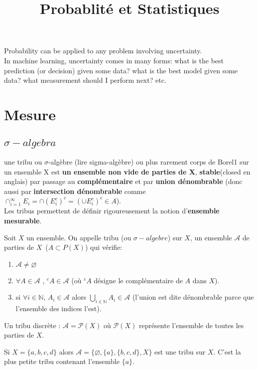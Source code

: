 \documentclass{article}
\begin{document}
\title{Probablit\'e et Statistiques}
\maketitle
\tableofcontents
\newpage
Probability can be applied to any problem involving uncertainty.\\
In machine learning, uncertainty comes in many forms: what is the best prediction (or decision) given some data?
what is the best model given some data? what measurement should I perform next? etc.
\section{Mesure}
\subsection{$\sigma-algebra$}
une tribu ou $\sigma$-alg\`ebre (lire sigma-alg\`ebre) ou plus rarement corps de Borel1
sur un ensemble X est \textbf{un ensemble non vide de parties de X},
\textbf{stable}(closed en anglais) par passage au \textbf{compl\'ementaire} et par \textbf{union d\'enombrable}
(donc aussi par \textbf{intersection d\'enombrable} comme $\cap_{i=1}^{\infty} E_i = \cap(E_i^c)^c = (\cup E_i^c)^c \in A$).\\
Les tribus permettent de d\'efinir rigoureusement la notion d'\textbf{ensemble mesurable}.

\begin{definition}
Soit $X$ un ensemble. On appelle tribu (ou $\sigma-algebre$) sur $X$, un ensemble $\mathcal{A}$ de parties de $X$\ ($A \subset P(X)$) qui v\'erifie:
\begin{enumerate}
\item $\mathcal{A} \not=\varnothing$
\item $\forall A \in \mathcal{A}$ ,  ${}^c A \in\mathcal{A}$  (o\`u ${}^cA$ d\'esigne le compl\'ementaire de $A$ dans $X$).
\item si $\forall i \in \mathbb{N}$, $A_i \in\mathcal{A}$  alors  $\bigcup_{i\in\mathbb{N} } A_i \in\mathcal{A}$
		(l'union est dite d\'enombrable parce que l'ensemble des indices l'est).
\end{enumerate}
\end{definition}

\begin{example}
Un tribu discr\`ete :  $\mathcal A = \mathcal P(X)$  o\`u  $\mathcal P(X)$ repr\'esente l'ensemble de toutes les parties de $X$.

Si $X=\{a,b,c,d\}$ alors  $\mathcal A=\{\varnothing, \{a\}, \{b, c, d\}, X\}$ est une tribu sur $X$. C'est la plus petite tribu contenant l'ensemble  $\{a\}$.
\end{example}
\end{document}
